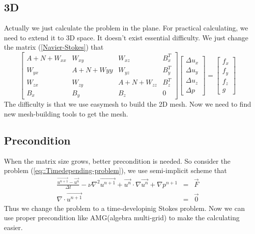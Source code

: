 \documentclass[a4paper]{article}
\begin{document}
\subsection{3D}
Actually we just calculate the problem in the plane. For practical calculating, we need to extend it to 3D space. It doesn't exist essential difficulty. We just change the matrix (\ref{Navier-Stokes}) that
\begin{equation}
\left[ \begin{array}{cccc}
A + N +W_{xx} & W_{xy} & W_{xz} & B_x^T \\
W_{yx} & A +N +W{yy}& W_{yz} & B_y^T \\
W_{zx} & W_{zy}  &A + N + W_{zz} & B_z^T \\
B_x & B_y &B_z& 0
\end{array}
\right]
\left[\begin{array}{cccc}
\Delta u_x\\
\Delta u_y\\
\Delta u_z\\
\Delta p
\end{array}
\right]=
\left[\begin{array}{cccc}
f_x\\
f_y\\
f_z\\
g
\end{array}
\right]
\label{3D-Navier-Stokes}
\end{equation}
The difficulty is that we use easymesh to build the 2D mesh. Now we need to find new mesh-building tools to get the mesh.
\subsection{Precondition}
When the matrix size grows, better precondition is needed. So consider the problem (\ref{eq::Timedepending-problem}), we use semi-implicit scheme that
\begin{equation}
\begin{array}{rcl}
\frac{\vec{u^{n+1}}-\vec{u^n}}{\Delta t} - \nu \nabla^2 \vec{u^{n+1}} + \vec{u^{n}}\cdot \nabla \vec{u^n} + \nabla p^{n+1} &=& \vec{F} \\
\nabla \cdot \vec{u^{n+1}} &=& \vec{0}
\label{eq::implicit and explicit}
\end{array}
\end{equation}
Thus we change the problem to a time-developinig Stokes problem. Now we can use proper precondition like AMG(algebra multi-grid) to make the calculating easier.



\end{document}
